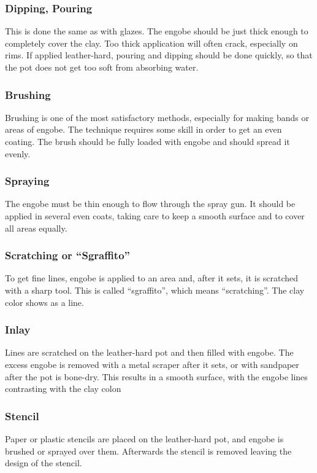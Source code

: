 \subsubsection{Dipping, Pouring}
This is done the same as with glazes. The engobe should be just thick enough to 
completely cover the clay. Too thick application will often crack, especially 
on rims. If applied leather-hard, pouring and dipping should be done quickly, 
so that the pot does not get too soft from absorbing water.
\subsubsection{Brushing}
Brushing is one of the most satisfactory methods, especially for making bands 
or areas of engobe. The technique requires some skill in order to get an even 
coating. The brush should be fully loaded with engobe and should spread it 
evenly.
\subsubsection{Spraying}
The engobe must be thin enough to flow through the spray gun. It should be 
applied in several even coats, taking care to keep a smooth surface and to 
cover all areas equally.
\subsubsection{Scratching or ``Sgraffito''}
To get fine lines, engobe is applied to an area and, after it sets, it is 
scratched with a sharp tool. This is called ``sgraffito'', which means 
``scratching''. The clay color shows as a line.
\subsubsection{Inlay}
Lines are scratched on the leather-hard pot and then filled with engobe. The 
excess engobe is removed with a metal scraper after it sets, or with sandpaper 
after the pot is bone-dry. This results in a smooth surface, with the engobe 
lines contrasting with the clay colon
\subsubsection{Stencil}
Paper or plastic stencils are placed on the leather-hard pot, and engobe is 
brushed or sprayed over them. Afterwards the stencil is removed leaving the 
design of the stencil.
